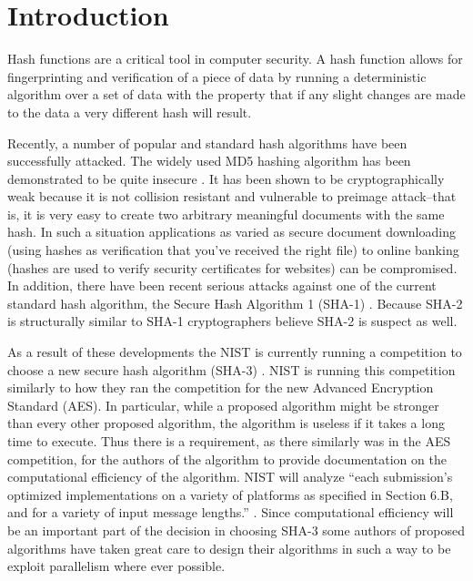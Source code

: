 \section*{Introduction}
Hash functions are a critical tool in computer security.
A hash function allows for fingerprinting and verification of a piece of data by running a deterministic algorithm over a set of data with the property that if any slight changes are made to the data a very different hash will result.
 
Recently, a number of popular and standard hash algorithms have been successfully attacked.
The widely used MD5 hashing algorithm has been demonstrated to be quite insecure \cite{Nostradamus}.
It has been shown to be cryptographically weak because it is not collision resistant and vulnerable to preimage attack--that is, it is very easy to create two arbitrary meaningful documents with the same hash.
In such a situation applications as varied as secure document downloading (using hashes as verification that you've received the right file) to online banking (hashes are used to verify security certificates for websites) can be compromised.
In addition, there have been recent serious attacks against one of the current standard hash algorithm, the Secure Hash Algorithm 1 (SHA-1) \cite{Sha1Collisions}.
Because SHA-2 is structurally similar to SHA-1 cryptographers believe SHA-2 is suspect as well.
 
As a result of these developments the NIST is currently running a competition to choose a new secure hash algorithm (SHA-3) \cite{Sha3Request}.
NIST is running this competition similarly to how they ran the competition for the new Advanced Encryption Standard (AES).
In particular, while a proposed algorithm might be stronger than every other proposed algorithm, the algorithm is useless if it takes a long time to execute.
Thus there is a requirement, as there similarly was in the AES competition, for the authors of the algorithm to provide documentation on the computational efficiency of the algorithm.
NIST will analyze ``each submission's optimized implementations on a variety of platforms as specified in Section 6.B, and for a variety of input message lengths.'' \cite{Sha3Request}.
Since computational efficiency will be an important part of the decision in choosing SHA-3 some authors of proposed algorithms have taken great care to design their algorithms in such a way to be exploit parallelism where ever possible.
